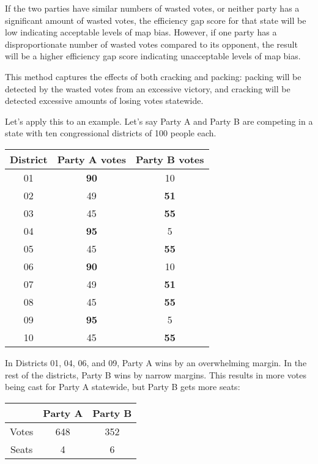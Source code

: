 \documentclass[sigconf]{acmart}
\begin{document}
If the two parties have similar numbers of wasted votes, or neither party has a significant amount of wasted votes, the efficiency gap score for that state will be low indicating acceptable levels of map bias. However, if one party has a disproportionate number of wasted votes compared to its opponent, the result will be a higher efficiency gap score indicating unacceptable levels of map bias.

This method captures the effects of both cracking and packing: packing will be detected by the wasted votes from an excessive victory, and cracking will be detected excessive amounts of losing votes statewide.

Let's apply this to an example. Let's say Party A and Party B are competing in a state with ten congressional districts of 100 people each.

\begin{center}
\begin{tabular}{ |c|c|c| } 
 \hline
 District & Party A votes & Party B votes \\
 \hline
 01 & \textbf{90} & 10 \\
 \hline
 02 & 49 & \textbf{51} \\
 \hline
 03 & 45 & \textbf{55} \\
 \hline
 04 & \textbf{95} & 5 \\
 \hline
 05 & 45 & \textbf{55} \\
 \hline
 06 & \textbf{90} & 10 \\
 \hline
 07 & 49 & \textbf{51} \\
 \hline
 08 & 45 & \textbf{55} \\
 \hline
 09 & \textbf{95} & 5 \\
 \hline
 10 & 45 & \textbf{55} \\
 \hline
\end{tabular}
\end{center}

In Districts 01, 04, 06, and 09, Party A wins by an overwhelming margin. In the rest of the districts, Party B wins by narrow margins. This results in more votes being cast for Party A statewide, but Party B gets more seats:

\begin{center}
    \begin{tabular}{|c|c|c|}
    \hline
            & Party A & Party B \\
    \hline
      Votes & 648 & 352 \\
    \hline
      Seats & 4 & 6 \\
    \hline
    \end{tabular}
\end{center}
\end{document}

